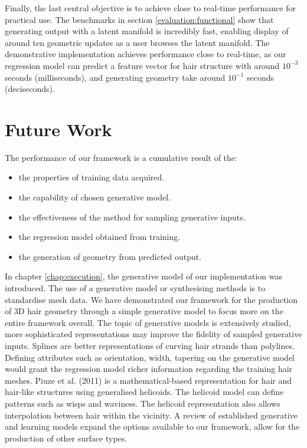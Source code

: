 \documentclass[ %
author={Dillon Keith Diep},
supervisor={Dr. Carl Henrik Ek},
degree={MEng},
title={ART-CG Hair:},
subtitle={Assisted Real-time Content Generation of Stylised Virtual Hair},
type={Research},
year={2017} ]{dissertation}
\begin{document}
	Finally, the last central objective is to achieve close to real-time performance for practical use. The benchmarks in section \ref{evaluation:functional} show that generating output with a latent manifold is incredibly fast, enabling display of around ten geometric updates as a user browses the latent manifold. The demonstrative implementation achieves performance close to real-time, as our regression model can predict a feature vector for hair structure with around $10^{-3}$ seconds (milliseconds), and generating geometry take around $10^{-1}$ seconds (deciseconds).
	
	\section{Future Work}
	The performance of our framework is a cumulative result of the: 
	\begin{itemize}
		\item the properties of training data acquired.
		\item the capability of chosen generative model.
		\item the effectiveness of the method for sampling generative inputs.
		\item the regression model obtained from training.
		\item the generation of geometry from predicted output.
	\end{itemize}
	
	In chapter \ref{chap:execution}, the generative model of our implementation was introduced. The use of a generative model or synthesising methods is to standardise mesh data. We have demonstrated our framework for the production of 3D hair geometry through a simple generative model to focus more on the entire framework overall.
	The topic of generative models is extensively studied, more sophisticated representations may improve the fidelity of sampled generative inputs. Splines are better representations of curving hair strands than polylines. Defining attributes such as orientation, width, tapering on the generative model would grant the regression model richer information regarding the training hair meshes. Piuze et al. (2011) \cite{helicoidhair} is a mathematical-based representation for hair and hair-like structures using generalised helicoids. The helicoid model can define patterns such as wisps and waviness. The helicoid representation also allows interpolation between hair within the vicinity. A review of established generative and learning models expand the options available to our framework, allow for the production of other surface types.
	
\end{document}
